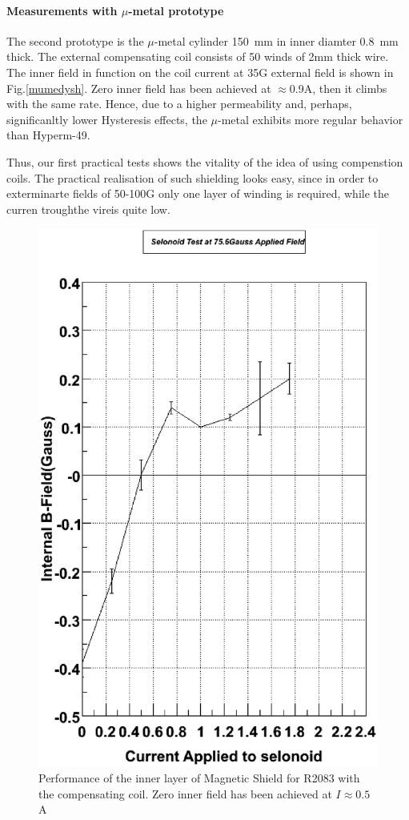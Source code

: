 \documentclass[12pt]{article}
\begin{document}
\paragraph{Measurements with $\mu$-metal prototype}
The second prototype is the $\mu$-metal cylinder  150~mm in inner  diamter 0.8~mm  thick.
The external compensating coil consists of 50 winds of 2mm thick wire.
The inner field in function on the coil current  at 35G  external field  is
shown  in Fig.\ref{mumedysh}. Zero inner field has been achieved  at   
$\approx$0.9A, then it climbs with the same rate.  
Hence, due to a higher permeability and, perhaps,
significanltly  lower  Hysteresis effects, 
the $\mu$-metal exhibits   more regular behavior than  Hyperm-49.

Thus, our first practical tests shows the vitality of
the idea of using compenstion coils. The practical realisation of such 
shielding looks easy, since in order to exterminarte fields of 50-100G
only one layer of winding is required, while the curren troughthe vireis
quite  low.
\begin{figure}
\centering
\includegraphics[width=.6\textwidth]{75.6_gauss.eps}
\caption{\small{ Performance of the inner layer of  Magnetic Shield for R2083
with the compensating coil. Zero inner field has been  achieved at $I\approx0.5$A }}
\label{hypermdysh}
\end{figure}
\end{document}
